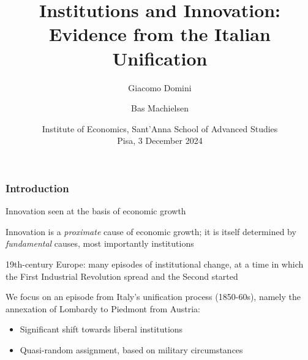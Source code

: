 \documentclass[10pt]{beamer}
\title[Institutions and innovation]{Institutions and Innovation: \\ Evidence from the Italian Unification}
\author[Domini \& Machielsen]{Giacomo Domini\inst{} 
    \and Bas Machielsen\inst{}}
\institute{
    \inst{} Utrecht University School of Economics}
\date[Dec 2024]{Institute of Economics, Sant'Anna School of Advanced Studies  \\ Pisa, 3 December 2024}
\begin{document}
\begin{frame}
  \titlepage
\end{frame}

\begin{frame}
    \frametitle{Introduction}
    
    Innovation seen at the basis of economic growth \citep{schumpeter1942, solow1957} \\  \bigskip
    
    Innovation is a \textit{proximate} cause of economic growth; it is itself determined by \textit{fundamental} causes, most importantly institutions \citep{acemoglu2005, north1973, north1990} \\    \bigskip
    
    \pause
    
    19th-century Europe: many episodes of institutional change, at a time in which the First Industrial Revolution spread and the Second  started \\    \bigskip

    We focus on an episode from Italy's unification process (1850-60s), namely the annexation of Lombardy to Piedmont from Austria:
    
    \begin{itemize}
        \item Significant shift towards liberal institutions
        \item Quasi-random assignment, based on military circumstances
    \end{itemize}

    \bigskip
    
    
\end{frame}
\end{document}
